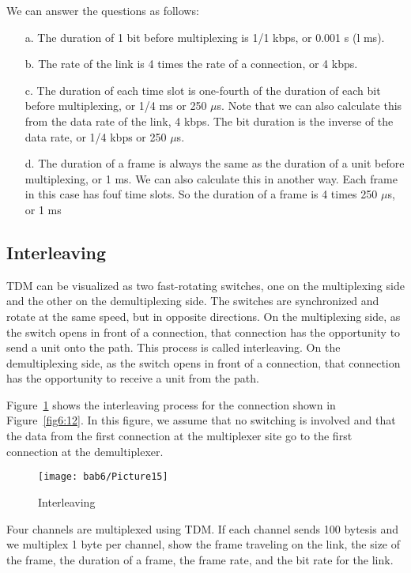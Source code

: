 \begin{solution}
  We can answer the questions as follows: 
  \begin{itemize}
    \item[a.] The duration of 1 bit before multiplexing is 1/1 kbps, or 0.001 s (l ms).
    \item[b.] The rate of the link is 4 times the rate of a connection, or 4 kbps.
    \item[c.] The duration of each time slot is one-fourth of the duration of each bit before multiplexing, or 1/4 ms or 250 $\mu$s. Note that we can also calculate this from the data rate of the link, 4 kbps. The bit duration is the inverse of the data rate, or 1/4 kbps or 250 $\mu$s.
    \item[d.] The duration of a frame is always the same as the duration of a unit before multiplexing, or 1 ms. We can also calculate this in another way. Each frame in this case has fouf time slots. So the duration of a frame is 4 times 250 $\mu$s, or 1 ms
  \end{itemize}
\end{solution}

\subsection*{Interleaving}
TDM can be visualized as two fast-rotating switches, one on the multiplexing side and the other on the demultiplexing side. The switches are synchronized and rotate at the same speed, but in opposite directions. On the multiplexing side, as the switch opens in front of a connection, that connection has the opportunity to send a unit onto the path. This process is called interleaving. On the demultiplexing side, as the switch opens in front of a connection, that connection has the opportunity to receive a unit from the path.

Figure~\ref{fig6:14} shows the interleaving process for the connection shown in Figure~\ref{fig6:12}. In this figure, we assume that no switching is involved and that the data from the first connection at the multiplexer site go to the first connection at the demultiplexer.

\begin{figure}[htbp]
  \centering
  \texttt{[image: bab6/Picture15]}
  \caption{Interleaving}
  \label{fig6:14}
\end{figure}

\begin{example}
  Four channels are multiplexed using TDM. If each channel sends 100 bytesis and we multiplex 1 byte per channel, show the frame traveling on the link, the size of the frame, the duration of a frame, the frame rate, and the bit rate for the link.
  \label{example6:8}
\end{example}

